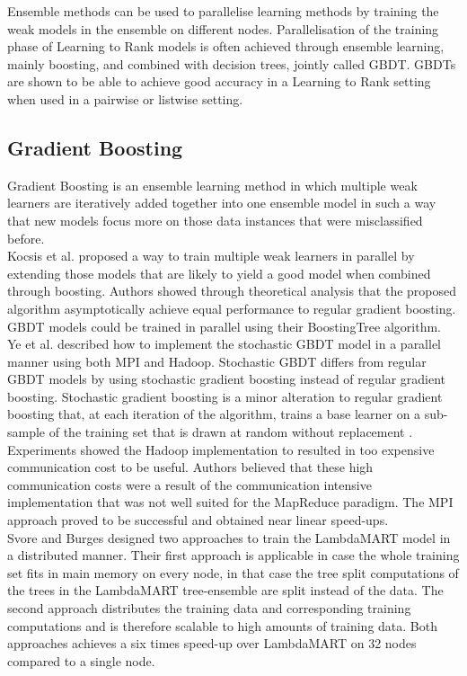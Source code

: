 Ensemble methods can be used to parallelise learning methods by training the weak models in the ensemble on different nodes. Parallelisation of the training phase of Learning to Rank models is often achieved through ensemble learning, mainly boosting, and combined with decision trees, jointly called \acf{GBDT}. \ac{GBDT}s are shown to be able to achieve good accuracy in a Learning to Rank setting when used in a pairwise \cite{Zheng2007} or listwise \cite{Chen2008} setting.

\subsection{Gradient Boosting}
Gradient Boosting \cite{Friedman2001} is an ensemble learning method in which multiple weak learners are iteratively added together into one ensemble model in such a way that new models focus more on those data instances that were misclassified before.\\

Kocsis et al. \cite{Kocsis2013} proposed a way to train multiple weak learners in parallel by extending those models that are likely to yield a good model when combined through boosting. Authors showed through theoretical analysis that the proposed algorithm asymptotically achieve equal performance to regular gradient boosting. \ac{GBDT} models could be trained in parallel using their BoostingTree algorithm.\\

Ye et al. \cite{Ye2009} described how to implement the stochastic \ac{GBDT} model in a parallel manner using both \ac{MPI} and Hadoop. Stochastic \ac{GBDT} differs from regular \ac{GBDT} models by using stochastic gradient boosting instead of regular gradient boosting. Stochastic gradient boosting is a minor alteration to regular gradient boosting that, at each iteration of the algorithm, trains a base learner on a sub-sample of the training set that is drawn at random without replacement \cite{Friedman2002}. Experiments showed the Hadoop implementation to resulted in too expensive communication cost to be useful. Authors believed that these high communication costs were a result of the communication intensive implementation that was not well suited for the MapReduce paradigm. The \ac{MPI} approach proved to be successful and obtained near linear speed-ups.\\

Svore and Burges \cite{Svore2010,Svore2012} designed two approaches to train the LambdaMART \cite{Wu2008} model in a distributed manner. Their first approach is applicable in case the whole training set fits in main memory on every node, in that case the tree split computations of the trees in the LambdaMART tree-ensemble are split instead of the data. The second approach distributes the training data and corresponding training computations and is therefore scalable to high amounts of training data. Both approaches achieves a six times speed-up over LambdaMART on 32 nodes compared to a single node.

